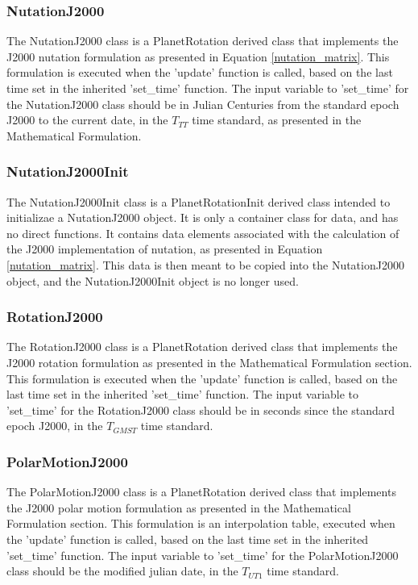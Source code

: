\subsubsection{NutationJ2000}

The NutationJ2000 class is a PlanetRotation derived class that implements the
J2000 nutation formulation as presented in Equation \eqref{nutation_matrix}.
This formulation is executed when the 'update' function is called, based
on the last time set in the inherited 'set\_time' function. The input
variable to 'set\_time' for the NutationJ2000 class should be in
Julian Centuries from the standard epoch J2000 to the current date, in the
$T_{TT}$ time standard, as presented in the Mathematical Formulation.


\subsubsection{NutationJ2000Init}

The NutationJ2000Init class is a PlanetRotationInit derived class
intended to initializae a NutationJ2000 object. It is only a container
class for data, and has no direct functions. It contains data
elements associated with the calculation of the J2000 implementation
of nutation, as presented in Equation \eqref{nutation_matrix}. This data
is then meant to be copied into the NutationJ2000 object, and the
NutationJ2000Init object is no longer used.

\subsubsection{RotationJ2000}

The RotationJ2000 class is a PlanetRotation derived class that implements the
J2000 rotation formulation as presented in the Mathematical Formulation
section. This formulation is executed when the 'update' function is called,
based on the last time set in the inherited 'set\_time' function. The input
variable to 'set\_time' for the RotationJ2000 class should be in seconds
since the standard epoch J2000, in the $T_{GMST}$ time standard.

\subsubsection{PolarMotionJ2000}

The PolarMotionJ2000 class is a PlanetRotation derived class that implements
the J2000 polar motion formulation as presented in the Mathematical Formulation
section. This formulation is an interpolation table, executed when the
'update' function is called, based on the last time set in the inherited
'set\_time' function. The input variable to 'set\_time' for the
PolarMotionJ2000 class should be the modified julian date, in the
$T_{UT1}$ time standard.

